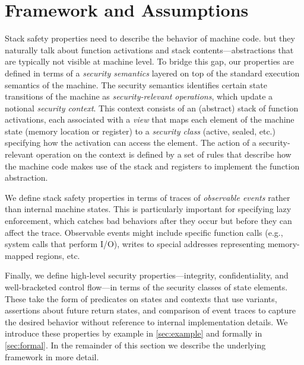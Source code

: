 \documentclass[10pt,conference]{ieeetran}%
\theoremstyle{definition}
\begin{document}

\section{Framework and Assumptions}
\label{sec:ideas}

Stack safety properties need to describe the behavior of machine code. but they naturally
talk about function activations and stack contents---abstractions that
are typically not visible at machine level. To bridge this gap,
our properties are defined in terms of a {\em security semantics} layered on top of
the standard execution semantics of the machine.  The security semantics identifies certain
state transitions of the machine as {\em security-relevant
  operations}, which update
a notional {\em security context}.  This context consists of
an (abstract) stack of function activations, each associated with a {\em view}
that maps each element of the machine state (memory location or register)
to a {\em security class} (active, sealed, etc.) specifying how the activation
can access the element.
The action of a security-relevant operation on the context is defined by a set
of rules that describe how the machine code makes use of the stack and registers
to implement the function abstraction.

We define stack safety properties in
terms of traces of {\em observable events} rather than internal machine states.
This is particularly important for
specifying lazy enforcement, which catches bad behaviors after they occur but
before they can affect the trace.
Observable events might include specific function calls (e.g., system
calls that perform I/O), writes to special addresses representing
memory-mapped regions, etc.

Finally, we define high-level security properties---integrity, confidentiality,
and well-bracketed control flow---in terms of the security classes of state
elements. These take the form of predicates on states and contexts
that use variants,
assertions about future return states, and comparison of event traces to capture the
desired behavior without reference to internal implementation details.
We introduce these properties by example in \cref{sec:example} and
formally in \cref{sec:formal}. In the remainder
of this section we describe the underlying framework in more detail.
\end{document}
